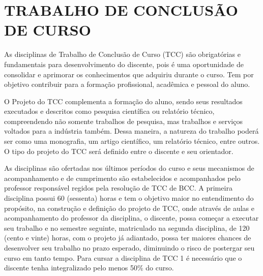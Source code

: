 \chapter{TRABALHO DE CONCLUSÃO DE CURSO}

As disciplinas de Trabalho de Conclusão de Curso (TCC) são obrigatórias e fundamentais para desenvolvimento do discente, pois é uma oportunidade de consolidar e aprimorar os conhecimentos que adquiriu durante o curso. Tem por objetivo contribuir para a formação profissional, acadêmica e pessoal do aluno.

O Projeto do TCC complementa a formação do aluno, sendo seus resultados executados e descritos como pesquisa científica ou relatório técnico, compreendendo não somente trabalhos de pesquisa, mas trabalhos e serviços voltados para a indústria também.  Dessa maneira, a natureza do trabalho poderá ser como uma monografia, um artigo científico, um relatório técnico, entre outros. O tipo do projeto do TCC será definido entre o discente e seu orientador.

As disciplinas são ofertadas nos últimos períodos do curso e seus mecanismos de acompanhamento e de cumprimento são estabelecidos e acompanhados pelo professor responsável regidos pela resolução de TCC de BCC. A primeira disciplina possui 60 (sessenta) horas e tem o objetivo maior no entendimento do propósito, na construção e definição do projeto de TCC, onde através de aulas e acompanhamento do professor da disciplina, o discente, possa começar a executar seu trabalho e no semestre seguinte, matriculado na segunda disciplina, de 120 (cento e vinte) horas, com o projeto já adiantado, possa ter maiores chances de desenvolver seu trabalho no prazo esperado, diminuindo o risco de postergar seu curso em tanto tempo. Para cursar a disciplina de TCC 1 é necessário que o discente tenha integralizado pelo menos 50\% do curso.
